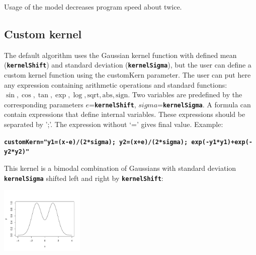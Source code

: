 \documentclass{article}
\newcommand{\tw}{\textwidth}
\newcommand{\prm}[1]{\texttt{\textbf{{#1}}}}
\begin{document}
Usage of the model decreases program speed about twice.


\subsection{Custom kernel}\label{custKernel}
The default algorithm uses the Gaussian kernel function with defined mean (\prm{kernelShift}) and standard deviation  
(\prm{kernelSigma}), but the user can define a custom kernel function using the customKern parameter. The user can put here any expression containing arithmetic operations and standard functions: {$\sin, \cos, \tan, \exp, \log, \text{sqrt}, \text{abs}, \text{sign}$}. 
Two variables are predefined by the corresponding parameters 
$e$=\prm{kernelShift}, $sigma$=\prm{kernelSigma}. A formula can contain expressions that define internal 
variables. These expressions should be separated by ';'. The expression without `=' gives final value.
 Example:
\begin{center}
\prm{customKern="y1=(x-e)/(2*sigma); y2=(x+e)/(2*sigma); exp(-y1*y1)+exp(-y2*y2)"}
\end{center}
This kernel is a bimodal combination of Gaussians with standard deviation \prm{kernelSigma} 
shifted left and right by \prm{kernelShift}:
\begin{center}
\includegraphics[width=0.3\tw]{fig/bimodal.pdf}
\end{center}
\end{document}
